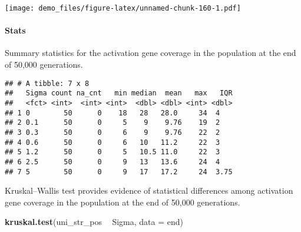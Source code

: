 \documentclass[]{book}
\newenvironment{Shaded}{\begin{snugshade}}{\end{snugshade}}
\newcommand{\DataTypeTok}[1]{\textcolor[rgb]{0.13,0.29,0.53}{#1}}
\newcommand{\KeywordTok}[1]{\textcolor[rgb]{0.13,0.29,0.53}{\textbf{#1}}}
\newcommand{\NormalTok}[1]{#1}
\newcommand{\OperatorTok}[1]{\textcolor[rgb]{0.81,0.36,0.00}{\textbf{#1}}}
\newcommand{\OtherTok}[1]{\textcolor[rgb]{0.56,0.35,0.01}{#1}}
\newcommand{\StringTok}[1]{\textcolor[rgb]{0.31,0.60,0.02}{#1}}
\let\oldparagraph\paragraph
\renewcommand{\paragraph}[1]{\oldparagraph{#1}\mbox{}}
\begin{document}
\texttt{[image: demo\_files/figure-latex/unnamed-chunk-160-1.pdf]}

\hypertarget{stats-72}{%
\paragraph{Stats}\label{stats-72}}

Summary statistics for the activation gene coverage in the population at the end of 50,000 generations.

\begin{Shaded}
\end{Shaded}

\begin{verbatim}
## # A tibble: 7 x 8
##   Sigma count na_cnt   min median  mean   max   IQR
##   <fct> <int>  <int> <int>  <dbl> <dbl> <int> <dbl>
## 1 0        50      0    18   28   28.0     34  4   
## 2 0.1      50      0     5    9    9.76    19  2   
## 3 0.3      50      0     6    9    9.76    22  2   
## 4 0.6      50      0     6   10   11.2     22  3   
## 5 1.2      50      0     5   10.5 11.0     22  3   
## 6 2.5      50      0     9   13   13.6     24  4   
## 7 5        50      0     9   17   17.2     24  3.75
\end{verbatim}

Kruskal--Wallis test provides evidence of statistical differences among activation gene coverage in the population at the end of 50,000 generations.

\begin{Shaded}
\begin{Highlighting}[]
\KeywordTok{kruskal.test}\NormalTok{(uni_str_pos }\OperatorTok{~}\StringTok{ }\NormalTok{Sigma, }\DataTypeTok{data =}\NormalTok{ end)}
\end{Highlighting}
\end{Shaded}
\end{document}
